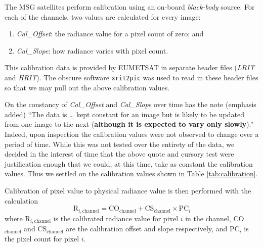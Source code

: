 The MSG satellites perform calibration using an on-board
\emph{black-body} source. For each of the channels, two values are
calculated for every image:
\begin{enumerate}
\item \emph{Cal\_Offset}: the radiance value for a pixel count of
  zero; and
\item \emph{Cal\_Slope}: how radiance varies with pixel count.
\end{enumerate}
This calibration data is provided by EUMETSAT in separate header files
(\emph{LRIT} and \emph{HRIT}). The obscure software \texttt{xrit2pic}
was used to read in these header files so that we may pull out the
above calibration values.

On the constancy of \emph{Cal\_Offset} and \emph{Cal\_Slope} over time
\cite{muller2007msg} has the note (emphasis added) ``The data is {\dots} kept
constant for an image but is likely to be updated from one image to the next
(\textbf{although it is expected to vary only slowly}).''  Indeed, upon
inspection the calibration values were not observed to change over a period of
time. While this was not tested over the entirety of the data, we decided in the
interest of time that the above quote and cursory test were justification enough
that we could, at this time, take as constant the calibration values. Thus we
settled on the calibration values shown in Table \ref{tab:calibration}.

\begin{table}
  \centering
  \caption{Calibration values for each band. It is assumed that these
    values vary only slowly, and so we have decided to use a single
    set of values.}
  \label{tab:calibration}
\end{table}

Calibration of pixel value to physical radiance value is then
performed with the calculation
\begin{equation}
    \textrm{R}_{i,\textrm{channel}} = \textrm{CO}_\textrm{channel} +
    \textrm{CS}_\textrm{channel} \times
    \textrm{PC}_i \label{eqn:calibration}
\end{equation}
where R$_{i,\textrm{channel}}$ is the calibrated radiance value for
pixel $i$ in the channel, CO$_\textrm{channel}$ and
CS$_\textrm{channel}$ are the calibration offset and slope
respectively, and PC$_i$ is the pixel count for pixel $i$.

